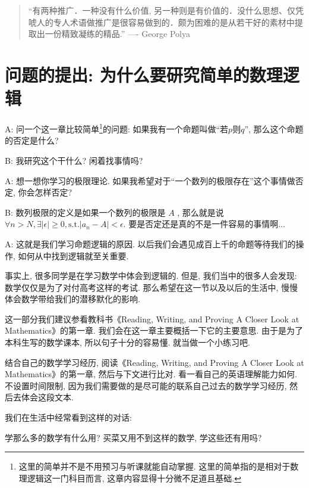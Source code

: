 \begin{quote}
	``有两种推广．一种没有什么价值, 另一种则是有价值的．没什么思想、仅凭唬人的专人术语做推广是很容易做到的．颇为困难的是从若干好的素材中提取出一份精致凝练的精品.''
	\hfill ---- George Polya
\end{quote}

\section{问题的提出: 为什么要研究简单的数理逻辑}


\begin{dialogue}
	A: 问一个这一章比较简单\footnote{这里的简单并不是不用预习与听课就能自动掌握. 这里的简单指的是相对于数理逻辑这一门科目而言, 这章内容显得十分微不足道且基础.}的问题: 如果我有一个命题叫做``若$p$则$q$'', 那么这个命题的否定是什么?
	
	B: 我研究这个干什么? 闲着找事情吗? 
	
	A: 想一想你学习的极限理论. 如果我希望对于``一个数列的极限存在''这个事情做否定, 你会怎样否定? 
	
	B: 数列极限的定义是如果一个数列的极限是 $A$ , 那么就是说$\forall n>N, \exists |\epsilon|\geq 0, \text{s.t.} |a_n-A|<\epsilon$. 要是否定还是真的不是一件容易的事情啊...
	
	A: 这就是我们学习命题逻辑的原因. 以后我们会遇见成百上千的命题等待我们的操作, 如何从中找到逻辑就至关重要. 
\end{dialogue}

事实上, 很多同学是在学习数学中体会到逻辑的. 但是, 我们当中的很多人会发现: 数学仅仅是为了对付高考这样的考试. 那么希望在这一节以及以后的生活中, 慢慢体会数学带给我们的潜移默化的影响. 

这一部分我们建议参看教科书《Reading, Writing, and Proving A Closer Look at Mathematics》的第一章. 我们会在这一章主要概括一下它的主要意思. 由于是为了本科生写的数学课本, 所以句子十分的容易懂. 就当做一个小练习吧. 

\begin{prob}
	结合自己的数学学习经历, 阅读《Reading, Writing, and Proving A Closer Look at Mathematics》的第一章, 然后与下文进行比对. 看一看自己的英语理解能力如何. 不设置时间限制, 因为我们需要做的是尽可能的联系自己过去的数学学习经历, 然后去体会这段文本. 
\end{prob}


我们在生活中经常看到这样的对话: 
\begin{dialogue}
	学那么多的数学有什么用? 买菜又用不到这样的数学, 学这些还有用吗? 
\end{dialogue}

